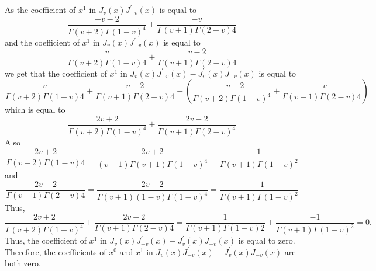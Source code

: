 As the coefficient of $x^{1}$ in $J_{v}(x) J_{-v}^{\prime}(x)$ is equal to 
$$\frac{-v-2}{\Gamma(v+2) \Gamma(1-v)^{4}}+\frac{-v}{\Gamma(v+1) \Gamma(2-v) 4}$$
and the coefficient of $x^{1}$ in $J_{v}(x) J_{-v}^{\prime}(x)$ is equal to 
$$\frac{v}{\Gamma(v+2) \Gamma(1-v) 4}+\frac{v-2}{\Gamma(v+1) \Gamma(2-v) 4}$$
we get that the coefficient of $x^{1}$ in $J_{v}(x) J_{-v}^{\prime}(x)-J_{v}^{\prime}(x) J_{-v}(x)$ is equal to 
$$\frac{v}{\Gamma(v+2) \Gamma(1-v) 4}+\frac{v-2}{\Gamma(v+1) \Gamma(2-v) 4}-\left(\frac{-v-2}{\Gamma(v+2) \Gamma(1-v)^{4}}+\frac{-v}{\Gamma(v+1) \Gamma(2-v) 4}\right)$$ 
which is equal to 
$$\frac{2 v+2}{\Gamma(v+2) \Gamma(1-v)^{4}}+\frac{2 v-2}{\Gamma(v+1) \Gamma(2-v)^{4}}$$
Also 
$$\frac{2 v+2}{\Gamma(v+2) \Gamma(1-v) 4}=\frac{2 v+2}{(v+1) \Gamma(v+1) \Gamma(1-v)^{4}}=\frac{1}{\Gamma(v+1) \Gamma(1-v)^{2}}$$ 
and
$$\frac{2 v-2}{\Gamma(v+1) \Gamma(2-v) 4}=\frac{2 v-2}{\Gamma(v+1)(1-v) \Gamma(1-v)^{4}}=\frac{-1}{\Gamma(v+1) \Gamma(1-v)^{2}}$$
Thus, 
$$\frac{2 v+2}{\Gamma(v+2) \Gamma(1-v)^{4}}+\frac{2 v-2}{\Gamma(v+1) \Gamma(2-v) 4}=\frac{1}{\Gamma(v+1) \Gamma(1-v) 2}+\frac{-1}{\Gamma(v+1) \Gamma(1-v)^{2}}=0 .$$
Thus, the coefficient of $x^{1}$ in $J_{v}(x) J_{-v}^{\prime}(x)-J_{v}^{\prime}(x) J_{-v}(x)$ is equal to zero. Therefore, the coefficients of $x^{0}$ and $x^{1}$ in $J_{v}(x) J_{-v}^{\prime}(x)-J_{v}^{\prime}(x) J_{-v}(x)$ are both zero.

\newpage


